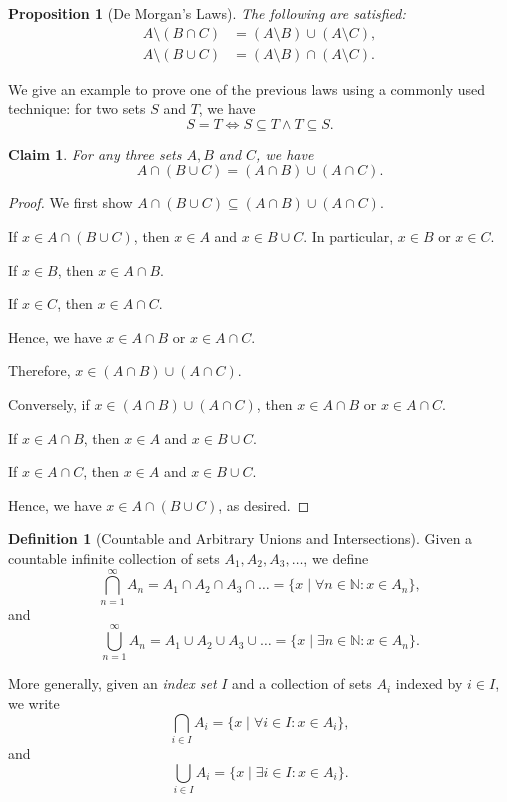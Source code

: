 \documentclass{article}
\newtheorem{proposition}[theorem]{Proposition}
\newtheorem{claim}[theorem]{Claim}
\theoremstyle{definition}
\newtheorem{definition}[theorem]{Definition}
\theoremstyle{remark}
\newcommand{\pqty}[1]{\left(#1\right)}
\newcommand{\set}[2]{\{#1\mid #2\}}
\newcommand{\NN}{\mathbb{N}}
\begin{document}
\begin{proposition}[De Morgan's Laws]
    The following are satisfied:
    \begin{align*}
        A \setminus \pqty{B \cap C} &= \pqty{A \setminus B} \cup \pqty{A \setminus C}, \\
        A \setminus \pqty{B \cup C} &= \pqty{A \setminus B} \cap \pqty{A \setminus C}.
    \end{align*}
\end{proposition}

We give an example to prove one of the previous laws using a commonly used technique: for two sets \(S\) and \(T\), we have
\[
    S = T \iff S \subseteq T \land T \subseteq S.
\]

\begin{claim}
    For any three sets \(A, B\) and \(C\), we have
    \[
        A \cap \pqty{B \cup C} = \pqty{A \cap B} \cup \pqty{A \cap C}.
    \]
\end{claim}

\begin{proof}
    We first show \(A \cap \pqty{B \cup C} \subseteq \pqty{A \cap B} \cup \pqty{A \cap C}\).

    If \(x \in A \cap \pqty{B \cup C}\), then \(x \in A\) and \(x \in B \cup C\). In particular, \(x \in B\) or \(x \in C\).

    If \(x \in B\), then \(x \in A \cap B\).

    If \(x \in C\), then \(x \in A \cap C\).

    Hence, we have \(x \in A \cap B\) or \(x \in A \cap C\).

    Therefore, \(x \in \pqty{A \cap B} \cup \pqty{A \cap C}\).

    Conversely, if \(x \in \pqty{A \cap B} \cup \pqty{A \cap C}\), then \(x \in A \cap B\) or \(x \in A \cap C\).

    If \(x \in A \cap B\), then \(x \in A\) and \(x \in B \cup C\).

    If \(x \in A \cap C\), then \(x \in A\) and \(x \in B \cup C\).

    Hence, we have \(x \in A \cap \pqty{B \cup C}\), as desired.
\end{proof}

\begin{definition}[Countable and Arbitrary Unions and Intersections]
    Given a countable infinite collection of sets \(A_1, A_2, A_3, \ldots\), we define
    \[
        \bigcap_{n = 1}^{\infty} A_n = A_1 \cap A_2 \cap A_3 \cap \ldots = \set{x}{\forall n \in \NN: x \in A_n},
    \]
    and
    \[
        \bigcup_{n = 1}^{\infty} A_n = A_1 \cup A_2 \cup A_3 \cup \ldots = \set{x}{\exists n \in \NN: x \in A_n}.
    \]

    More generally, given an \emph{index set} \(I\) and a collection of sets \(A_i\) indexed by \(i \in I\), we write
    \[
        \bigcap_{i \in I} A_i = \set{x}{\forall i \in I: x \in A_i},
    \]
    and
    \[
        \bigcup_{i \in I} A_i = \set{x}{\exists i \in I: x \in A_i}.
    \]
\end{definition}
\end{document}
